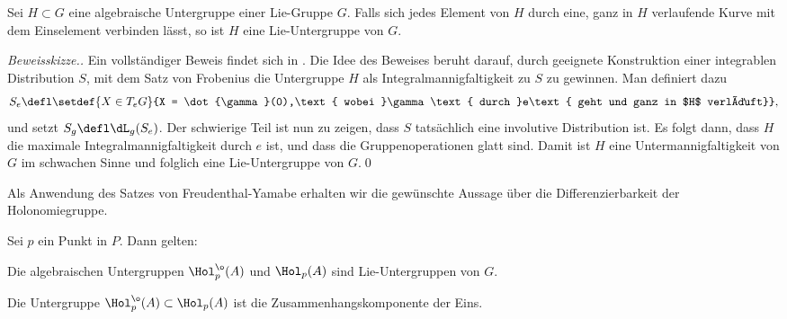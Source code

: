 \documentclass[%
	paper=a5,%
	fleqn,%
	DIV=18,%
	BCOR=0mm,
	fontsize=11pt,
	titlepage=false,%
	bibliography=totoc,
	DIV=18,%
	twoside=true,
	pdftitle=Riemannsche Geometrie,
	pdfauthor=Uwe Semmelmann,
	numbers=noendperiod]%
	{scrbook}
\begin{document}
\begin{prop}
Sei $H\subset G$ eine algebraische Untergruppe einer Lie-Gruppe $G$. Falls sich jedes Element von $H$ durch eine, ganz in $H$ verlaufende Kurve mit dem Einselement verbinden lässt, so ist $H$ eine Lie-Untergruppe von $G$.\fish
\end{prop}
\begin{proof}[Beweisskizze.] Ein vollständiger Beweis findet sich in \cite[Satz 1.22]{Baum:2009wk}.
Die Idee des Beweises beruht darauf, durch geeignete Konstruktion einer integrablen Distribution $S$, mit dem Satz von Frobenius die Untergruppe $H$ als Integralmannigfaltigkeit zu $S$ zu gewinnen. Man definiert dazu
\begin{align*}
S_{e}\defl \setdef{X\in T_{e}G}{X = \dot{\gamma}(0),\text{ wobei }\gamma\text{ durch }e\text{ geht und ganz in $H$ verläuft}},
\end{align*}
und setzt $S_{g} \defl \dL_{g}(S_{e})$. Der schwierige Teil ist nun zu zeigen, dass $S$ tatsächlich eine involutive Distribution ist. Es folgt dann, dass $H$ die maximale Integralmannigfaltigkeit durch $e$ ist, und dass die Gruppenoperationen glatt sind. Damit ist $H$ eine Untermannigfaltigkeit von $G$ im schwachen Sinne und folglich eine Lie-Untergruppe von $G$.\qed
\end{proof}

Als Anwendung des Satzes von Freudenthal-Yamabe erhalten wir die gewünschte Aussage über die Differenzierbarkeit der Holonomiegruppe.

\begin{prop}
Sei $p$ ein Punkt in $P$. Dann gelten:
\begin{propenum}
\item Die algebraischen Untergruppen $\Hol_{p}^{\o}(A)$ und $\Hol_{p}(A)$ sind Lie-Untergruppen von $G$.
\item Die Untergruppe $\Hol_{p}^{\o}(A)\subset \Hol_{p}(A)$ ist die Zusammenhangskomponente der Eins.\fish
\end{propenum}
\end{prop}
\end{document}

